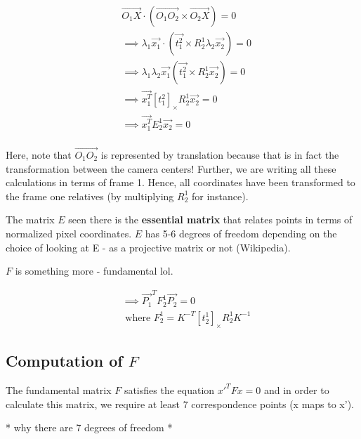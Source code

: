 \begin{equation}
\begin{split}
    &\overrightarrow{O_1X}\cdot(\overrightarrow{O_1O_2} \times \overrightarrow{O_2X}) = 0 \\
    &\implies \lambda_1\overrightarrow{x_1}\cdot(\overrightarrow{t_1^2}\times R_2^1\lambda_2\overrightarrow{x_2}) = 0 \\
    &\implies \lambda_1\lambda_2\overrightarrow{x_1}(\overrightarrow{t_1^2}\times R_2^1\overrightarrow{x_2}) = 0\\
    &\implies \overrightarrow{x_1^T}[t_1^2]_{\times}R_2^1\overrightarrow{x_2} = 0 \\
    &\implies \overrightarrow{x_1^T}E_2^1\overrightarrow{x_2} = 0 \\
\end{split}
\end{equation}

Here, note that $\overrightarrow{O_1O_2}$ is represented by translation because that is in fact the transformation between the camera centers! Further, we are writing all these calculations in terms of frame 1. Hence, all coordinates have been transformed to the frame one relatives (by multiplying $R_2^1$ for instance). 

The matrix $E$ seen there is the \textbf{essential matrix} that relates points in terms of normalized pixel coordinates. $E$ has 5-6 degrees of freedom depending on the choice of looking at E - as a projective matrix or not (Wikipedia).

$F$ is something more - fundamental lol. 

\begin{equation}
\begin{split}
    &\implies  \overrightarrow{P_1}^TF_2^1\overrightarrow{P_2} = 0 \\
    &\text{ where $F_2^1 = K^{-T}[t_2^1]_{\times}R_2^1K^{-1}$}
\end{split}
\end{equation}

\subsection{Computation of $F$}

The fundamental matrix $F$ satisfies the equation $x'^TFx = 0$ and in order to calculate this matrix, we require at least 7 correspondence points (x maps to x'). 

* why there are 7 degrees of freedom *


